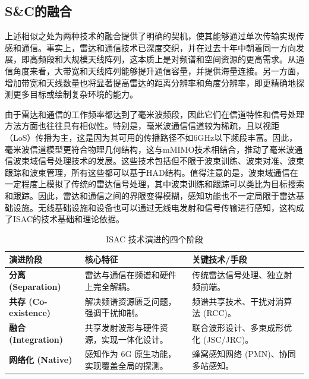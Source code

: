 \subsection{S\&C的融合}

上述相似之处为两种技术的融合提供了明确的契机，使其能够通过单次传输实现传感和通信。事实上，雷达和通信技术已深度交织，并在过去十年中朝着同一方向发展，即高频段和大规模天线阵列，这本质上是对频谱和空间资源的更高需求。从通信角度来看，大带宽和天线阵列能够​​提升通信容量，并提供海量连接。另一方面，增加带宽和天线数量也将显著提高雷达的距离分辨率和角度分辨率，即更精确地探测更多目标或绘制复杂环境的能力。

由于雷达和通信的工作频率都达到了毫米波频段，因此它们在信道特性和信号处理方法方面也往往具有相似性。特别是，毫米波通信信道较为稀疏，且以视距（LoS）传播为主，这是因为其可用的传播路径不如6GHz以下频段丰富。因此，毫米波信道模型更符合物理几何结构，这与mMIMO技术相结合，推动了毫米波通信波束域信号处理技术的发展。这些技术包括但不限于波束训练、波束对准、波束跟踪和波束管理，所有这些都可以基于HAD结构。值得注意的是，波束域通信在一定程度上模拟了传统的雷达信号处理，其中波束训练和跟踪可以类比为目标搜索和跟踪。因此，雷达和通信之间的界限变得模糊，感知功能也不一定局限于雷达基础设施。无线基础设施和设备也可以通过无线电发射和信号传输进行感知，这构成了ISAC的技术基础和理论依据。

\begin{table}[htbp]
	\centering
	\caption{ISAC 技术演进的四个阶段}
	\label{tab:isac_history}
	\begin{tabular}{lp{5cm}p{5cm}}
		\toprule
		\textbf{演进阶段} & \textbf{核心特征} & \textbf{关键技术/手段} \\
		\midrule
		\textbf{分离 (Separation)} & 雷达与通信在频谱和硬件上完全解耦。 & 传统雷达信号处理、独立射频前端。 \\
		\addlinespace
		\textbf{共存 (Co-existence)} & 解决频谱资源匮乏问题，强调干扰抑制。 & 频谱共享技术、干扰对消算法 (RCC)。 \\
		\addlinespace
		\textbf{融合 (Integration)} & 共享发射波形与硬件资源，实现一体化设计。 & 联合波形设计、多束成形优化 (JSC/JRC)。 \\
		\addlinespace
		\textbf{网络化 (Native)} & 感知作为 6G 原生功能，实现覆盖全局的探测。 & 蜂窝感知网络 (PMN)、协同多站感知。 \\
		\bottomrule
	\end{tabular}
\end{table}
